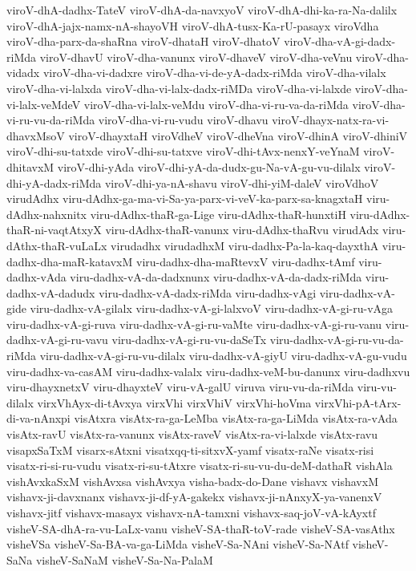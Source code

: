 {viroV-dhA-dadhx-TateV
viroV-dhA-da-navxyoV
viroV-dhA-dhi-ka-ra-Na-dalilx
viroV-dhA-jajx-namx-nA-shayoVH
viroV-dhA-tusx-Ka-rU-pasayx
viroVdha
viroV-dha-parx-da-shaRna
viroV-dhataH
viroV-dhatoV
viroV-dha-vA-gi-dadx-riMda
viroV-dhavU
viroV-dha-vanunx
viroV-dhaveV
viroV-dha-veVnu
viroV-dha-vidadx
viroV-dha-vi-dadxre
viroV-dha-vi-de-yA-dadx-riMda
viroV-dha-vilalx
viroV-dha-vi-lalxda
viroV-dha-vi-lalx-dadx-riMDa
viroV-dha-vi-lalxde
viroV-dha-vi-lalx-veMdeV
viroV-dha-vi-lalx-veMdu
viroV-dha-vi-ru-va-da-riMda
viroV-dha-vi-ru-vu-da-riMda
viroV-dha-vi-ru-vudu
viroV-dhavu
viroV-dhayx-natx-ra-vi-dhavxMsoV
viroV-dhayxtaH
viroVdheV
viroV-dheVna
viroV-dhinA
viroV-dhiniV
viroV-dhi-su-tatxde
viroV-dhi-su-tatxve
viroV-dhi-tAvx-nenxY-veYnaM
viroV-dhitavxM
viroV-dhi-yAda
viroV-dhi-yA-da-dudx-gu-Na-vA-gu-vu-dilalx
viroV-dhi-yA-dadx-riMda
viroV-dhi-ya-nA-shavu
viroV-dhi-yiM-daleV
viroVdhoV
virudAdhx
viru-dAdhx-ga-ma-vi-Sa-ya-parx-vi-veV-ka-parx-sa-knagxtaH
viru-dAdhx-nahxnitx
viru-dAdhx-thaR-ga-Lige
viru-dAdhx-thaR-hunxtiH
viru-dAdhx-thaR-ni-vaqtAtxyX
viru-dAdhx-thaR-vanunx
viru-dAdhx-thaRvu
virudAdx
viru-dAthx-thaR-vuLaLx
virudadhx
virudadhxM
viru-dadhx-Pa-la-kaq-dayxthA
viru-dadhx-dha-maR-katavxM
viru-dadhx-dha-maRtevxV
viru-dadhx-tAmf
viru-dadhx-vAda
viru-dadhx-vA-da-dadxnunx
viru-dadhx-vA-da-dadx-riMda
viru-dadhx-vA-dadudx
viru-dadhx-vA-dadx-riMda
viru-dadhx-vAgi
viru-dadhx-vA-gide
viru-dadhx-vA-gilalx
viru-dadhx-vA-gi-lalxvoV
viru-dadhx-vA-gi-ru-vAga
viru-dadhx-vA-gi-ruva
viru-dadhx-vA-gi-ru-vaMte
viru-dadhx-vA-gi-ru-vanu
viru-dadhx-vA-gi-ru-vavu
viru-dadhx-vA-gi-ru-vu-daSeTx
viru-dadhx-vA-gi-ru-vu-da-riMda
viru-dadhx-vA-gi-ru-vu-dilalx
viru-dadhx-vA-giyU
viru-dadhx-vA-gu-vudu
viru-dadhx-va-casAM
viru-dadhx-valalx
viru-dadhx-veM-bu-danunx
viru-dadhxvu
viru-dhayxnetxV
viru-dhayxteV
viru-vA-galU
viruva
viru-vu-da-riMda
viru-vu-dilalx
virxVhAyx-di-tAvxya
virxVhi
virxVhiV
virxVhi-hoVma
virxVhi-pA-tArx-di-va-nAnxpi
visAtxra
visAtx-ra-ga-LeMba
visAtx-ra-ga-LiMda
visAtx-ra-vAda
visAtx-ravU
visAtx-ra-vanunx
visAtx-raveV
visAtx-ra-vi-lalxde
visAtx-ravu
visapxSaTxM
visarx-sAtxni
visatxqq-ti-sitxvX-yamf
visatx-raNe
visatx-risi
visatx-ri-si-ru-vudu
visatx-ri-su-tAtxre
visatx-ri-su-vu-du-deM-dathaR
vishAla
vishAvxkaSxM
vishAvxsa
vishAvxya
visha-badx-do-Dane
vishavx
vishavxM
vishavx-ji-davxnanx
vishavx-ji-df-yA-gakekx
vishavx-ji-nAnxyX-ya-vanenxV
vishavx-jitf
vishavx-masayx
vishavx-nA-tamxni
vishavx-saq-joV-vA-kAyxtf
visheV-SA-dhA-ra-vu-LaLx-vanu
visheV-SA-thaR-toV-rade
visheV-SA-vasAthx
visheVSa
visheV-Sa-BA-va-ga-LiMda
visheV-Sa-NAni
visheV-Sa-NAtf
visheV-SaNa
visheV-SaNaM
visheV-Sa-Na-PalaM
}
